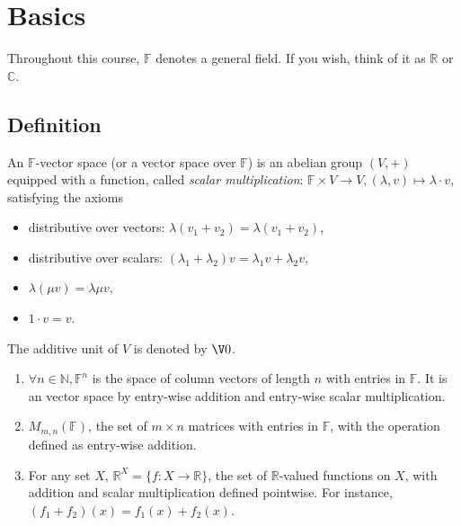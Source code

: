 \documentclass[a4paper]{article}
\theoremstyle{definition}
\begin{document}


\tableofcontents

\section{Basics}

\begin{convention}
  Throughout this course, $\mathbb{F}$ denotes a general field. If you wish, think of it as $\mathbb{R}$ or $\mathbb{C}$.
\end{convention}

\subsection{Definition}

\begin{defi}
  An $\mathbb{F}$-vector space (or a vector space over $\mathbb{F}$) is an abelian group $(V, +)$ equipped with a function, called \emph{scalar multiplication}: $\mathbb{F}\times V \to V, (\lambda, v) \mapsto \lambda\cdot v$, satisfying the axioms
  \begin{itemize}
  \item distributive over vectors: $\lambda(v_1+v_2) = \lambda(v_1+v_2)$,
  \item distributive over scalars: $(\lambda_1+\lambda_2)v= \lambda_1 v+\lambda_2 v$,
  \item $\lambda(\mu v) = \lambda \mu v$,
  \item $1\cdot v = v$.
  \end{itemize}
\end{defi}

The additive unit of $V$ is denoted by $\V 0$.

\begin{eg}\leavevmode
  \label{eg:matrix as V}
  \begin{enumerate}
  \item $\forall n \in \mathbb{N}, \mathbb{F}^n$ is the space of column vectors of length $n$ with entries in $\mathbb{F}$. It is an vector space by entry-wise addition and entry-wise scalar multiplication.
  \item $M_{m,n}(\mathbb{F})$, the set of $m\times n$ matrices with entries in $\mathbb{F}$, with the operation defined as entry-wise addition.
    \item For any set $X$, $\mathbb{R}^X = \{f: X \to \mathbb{R}\}$, the set of $\mathbb{R}$-valued functions on $X$, with addition and scalar multiplication defined pointwise. For instance, $(f_1+f_2)(x) = f_1(x)+f_2(x)$.
  \end{enumerate}
\end{eg}
\end{document}
